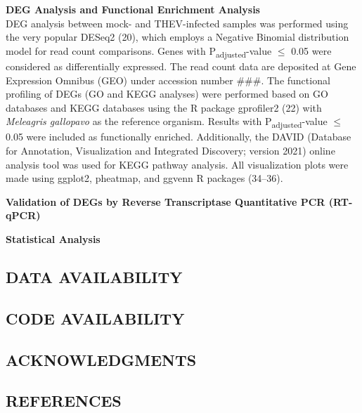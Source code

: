 \documentclass[
]{article}
\begin{document}
\textbf{DEG Analysis and Functional Enrichment Analysis}\\
DEG analysis between mock- and THEV-infected samples was performed using
the very popular DESeq2 (20), which employs a Negative Binomial
distribution model for read count comparisons. Genes with
P\textsubscript{adjusted}-value \(\leq\) 0.05 were considered as
differentially expressed. The read count data are deposited at Gene
Expression Omnibus (GEO) under accession number \#\#\#. The functional
profiling of DEGs (GO and KEGG analyses) were performed based on GO
databases and KEGG databases using the R package gprofiler2 (22) with
\emph{Meleagris gallopavo} as the reference organism. Results with
P\textsubscript{adjusted}-value \(\leq\) 0.05 were included as
functionally enriched. Additionally, the DAVID (Database for Annotation,
Visualization and Integrated Discovery; version 2021) online analysis
tool was used for KEGG pathway analysis. All visualization plots were
made using ggplot2, pheatmap, and ggvenn R packages (34--36).

\textbf{Validation of DEGs by Reverse Transcriptase Quantitative PCR
(RT-qPCR)}

\textbf{Statistical Analysis} \newpage

\subsection{DATA AVAILABILITY}\label{data-availability}

\newpage

\subsection{CODE AVAILABILITY}\label{code-availability}

\newpage

\subsection{ACKNOWLEDGMENTS}\label{acknowledgments}

\newpage

\subsection{REFERENCES}\label{references}

\setlength{\parindent}{-0.25in}
\setlength{\leftskip}{0.25in}

\noindent
\end{document}

